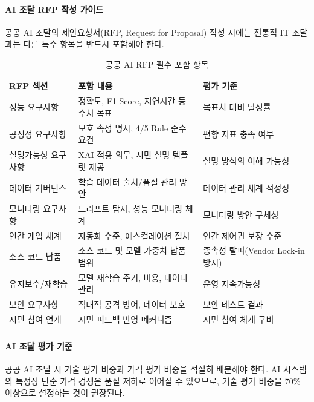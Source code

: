 \paragraph{AI 조달 RFP 작성 가이드}

공공 AI 조달의 제안요청서(RFP, Request for Proposal) 작성 시에는 전통적 IT 조달과는 다른 특수 항목을 반드시 포함해야 한다.

\begin{table}[htbp]
\centering
\caption{공공 AI RFP 필수 포함 항목}
\label{tab:18_rfp}
\begin{tabularx}{\textwidth}{p{3cm}Xp{3.5cm}}
\toprule
\textbf{RFP 섹션} & \textbf{포함 내용} & \textbf{평가 기준} \\
\midrule
성능 요구사항 & 정확도, F1-Score, 지연시간 등 수치 목표 & 목표치 대비 달성률 \\
공정성 요구사항 & 보호 속성 명시, 4/5 Rule 준수 요건 & 편향 지표 충족 여부 \\
설명가능성 요구사항 & XAI 적용 의무, 시민 설명 템플릿 제공 & 설명 방식의 이해 가능성 \\
데이터 거버넌스 & 학습 데이터 출처/품질 관리 방안 & 데이터 관리 체계 적정성 \\
모니터링 요구사항 & 드리프트 탐지, 성능 모니터링 체계 & 모니터링 방안 구체성 \\
인간 개입 체계 & 자동화 수준, 에스컬레이션 절차 & 인간 제어권 보장 수준 \\
소스 코드 납품 & 소스 코드 및 모델 가중치 납품 범위 & 종속성 탈피(Vendor Lock-in 방지) \\
유지보수/재학습 & 모델 재학습 주기, 비용, 데이터 관리 & 운영 지속가능성 \\
보안 요구사항 & 적대적 공격 방어, 데이터 보호 & 보안 테스트 결과 \\
시민 참여 연계 & 시민 피드백 반영 메커니즘 & 시민 참여 체계 구비 \\
\bottomrule
\end{tabularx}
\end{table}

\paragraph{AI 조달 평가 기준}

공공 AI 조달 시 기술 평가 비중과 가격 평가 비중을 적절히 배분해야 한다. AI 시스템의 특성상 단순 가격 경쟁은 품질 저하로 이어질 수 있으므로, 기술 평가 비중을 70\% 이상으로 설정하는 것이 권장된다.

